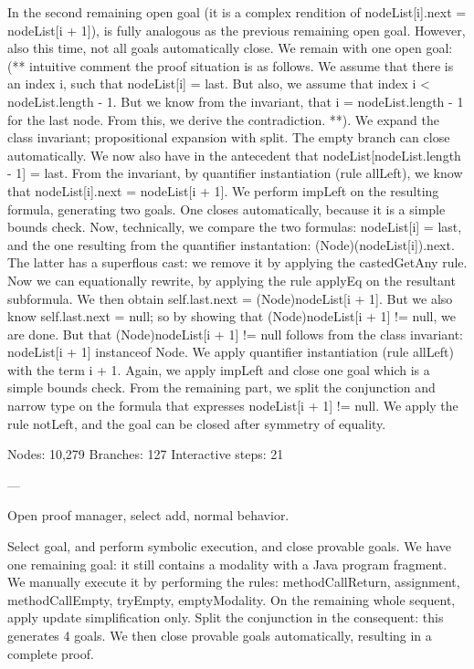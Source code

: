 In the second remaining open goal (it is a complex rendition of nodeList[i].next = nodeList[i + 1]), is fully analogous as the previous remaining open goal. However, also this time, not all goals automatically close. We remain with one open goal: (** intuitive comment the proof situation is as follows. We assume that there is an index i, such that nodeList[i] = last. But also, we assume that index i < nodeList.length - 1. But we know from the invariant, that i = nodeList.length - 1 for the last node. From this, we derive the contradiction. **). We expand the class invariant; propositional expansion with split. The empty branch can close automatically. We now also have in the antecedent that nodeList[nodeList.length - 1] = last. From the invariant, by quantifier instantiation (rule allLeft), we know that nodeList[i].next = nodeList[i + 1]. We perform impLeft on the resulting formula, generating two goals. One closes automatically, because it is a simple bounds check. Now, technically, we compare the two formulas: nodeList[i] = last, and the one resulting from the quantifier instantation: (Node)(nodeList[i]).next. The latter has a superflous cast: we remove it by applying the castedGetAny rule. Now we can equationally rewrite, by applying the rule applyEq on the resultant subformula. We then obtain self.last.next = (Node)nodeList[i + 1]. But we also know self.last.next = null; so by showing that (Node)nodeList[i + 1] != null, we are done. But that (Node)nodeList[i + 1] != null follows from the class invariant: nodeList[i + 1] instanceof Node. We apply quantifier instantiation (rule allLeft) with the term i + 1. Again, we apply impLeft and close one goal which is a simple bounds check. From the remaining part, we split the conjunction and narrow type on the formula that expresses nodeList[i + 1] != null. We apply the rule notLeft, and the goal can be closed after symmetry of equality.

Nodes: 10,279
Branches: 127
Interactive steps: 21

---

Open proof manager, select add, normal behavior.

Select goal, and perform symbolic execution, and close provable goals. We have one remaining goal: it still contains a modality with a Java program fragment. We manually execute it by performing the rules: methodCallReturn, assignment, methodCallEmpty, tryEmpty, emptyModality. On the remaining whole sequent, apply update simplification only. Split the conjunction in the consequent: this generates 4 goals. We then close provable goals automatically, resulting in a complete proof.

